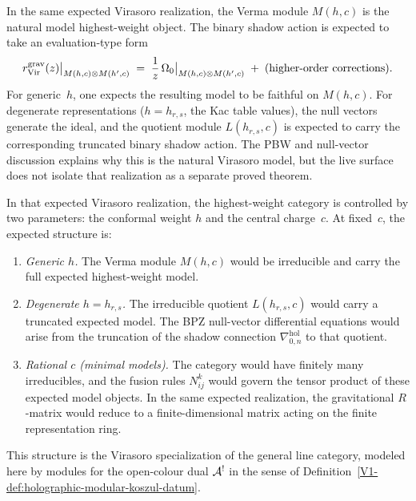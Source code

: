 \begin{remark}
In the same expected Virasoro realization, the Verma module $M(h,c)$
is the natural model highest-weight object. The binary shadow action
is expected to take an evaluation-type form
\begin{equation}%
\rgrav_{\mathrm{Vir}}(z)\big|_{M(h,c) \otimes M(h',c)}
\;=\;
\frac{1}{z}\,\Omega_0\big|_{M(h,c) \otimes M(h',c)}
\;+\;
\text{(higher-order corrections)}.
\end{equation}
For generic~$h$, one expects the resulting model to be faithful on
$M(h,c)$. For degenerate representations ($h = h_{r,s}$, the Kac
table values), the null vectors generate the ideal, and the quotient
module $L(h_{r,s},c)$ is expected to carry the corresponding truncated
binary shadow action. The PBW and null-vector discussion explains why
this is the natural Virasoro model, but the live surface does not
isolate that realization as a separate proved theorem.
\end{remark}

\begin{remark}
In that expected Virasoro realization, the highest-weight category is
controlled by two parameters: the conformal weight $h$ and the central
charge~$c$. At fixed~$c$, the expected structure is:
\begin{enumerate}[label=\textup{(\roman*)}]
\item \emph{Generic $h$.}
 The Verma module $M(h,c)$ would be irreducible and carry the full
 expected highest-weight model.
\item \emph{Degenerate $h = h_{r,s}$.}
 The irreducible quotient $L(h_{r,s},c)$ would carry a truncated
 expected model. The BPZ null-vector differential equations would
 arise from the truncation of the shadow connection
 $\nabla^{\mathrm{hol}}_{0,n}$ to that quotient.
\item \emph{Rational $c$ (minimal models).}
 The category would have finitely many irreducibles, and the fusion
 rules $N_{ij}^k$ would govern the tensor product of these expected
 model objects. In the same expected realization, the gravitational
 $R$-matrix would reduce to a finite-dimensional matrix acting on the
 finite representation ring.
\end{enumerate}
This structure is the Virasoro specialization of the general
line category, modeled here by modules for the open-colour dual
$\mathcal{A}^!$ in the sense of
Definition~\ref{V1-def:holographic-modular-koszul-datum}.
\end{remark}


